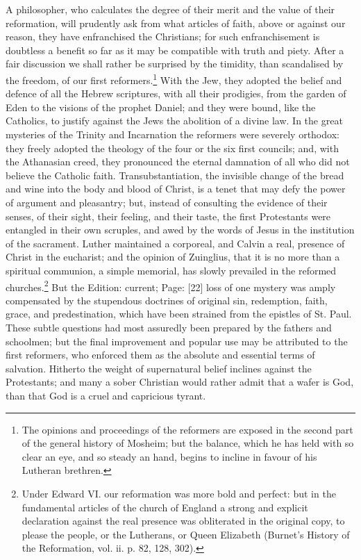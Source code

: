 A philosopher, who calculates the degree of their merit and the value of their reformation, will prudently ask from what articles of faith, above or against our reason, they have enfranchised the Christians; for such enfranchisement is doubtless a benefit so far as it may be compatible with truth and piety. After a fair discussion we shall rather be surprised by the timidity, than scandalised by the freedom, of our first reformers.\footnote{The opinions and proceedings of the reformers are exposed in the second part of the general history of Mosheim; but the balance, which he has held with so clear an eye, and so steady an hand, begins to incline in favour of his Lutheran brethren.} With the Jew, they adopted the belief and defence of all the Hebrew scriptures, with all their prodigies, from the garden of Eden to the visions of the prophet Daniel; and they were bound, like the Catholics, to justify against the Jews the abolition of a divine law. In the great mysteries of the Trinity and Incarnation the reformers were severely orthodox: they freely adopted the theology of the four or the six first councils; and, with the Athanasian creed, they pronounced the eternal damnation of all who did not believe the Catholic faith. Transubstantiation, the invisible change of the bread and wine into the body and blood of Christ, is a tenet that may defy the power of argument and pleasantry; but, instead of consulting the evidence of their senses, of their sight, their feeling, and their taste, the first Protestants were entangled in their own scruples, and awed by the words of Jesus in the institution of the sacrament. Luther maintained a corporeal, and Calvin a real, presence of Christ in the eucharist; and the opinion of Zuinglius, that it is no more than a spiritual communion, a simple memorial, has slowly prevailed in the reformed churches.\footnote{Under Edward VI. our reformation was more bold and perfect: but in the fundamental articles of the church of England a strong and explicit declaration against the real presence was obliterated in the original copy, to please the people, or the Lutherans, or Queen Elizabeth (Burnet\texthebrew{}’s History of the Reformation, vol. ii. p. 82, 128, 302).} But the Edition: current; Page: [22] loss of one mystery was amply compensated by the stupendous doctrines of original sin, redemption, faith, grace, and predestination, which have been strained from the epistles of St. Paul. These subtle questions had most assuredly been prepared by the fathers and schoolmen; but the final improvement and popular use may be attributed to the first reformers, who enforced them as the absolute and essential terms of salvation. Hitherto the weight of supernatural belief inclines against the Protestants; and many a sober Christian would rather admit that a wafer is God, than that God is a cruel and capricious tyrant.

